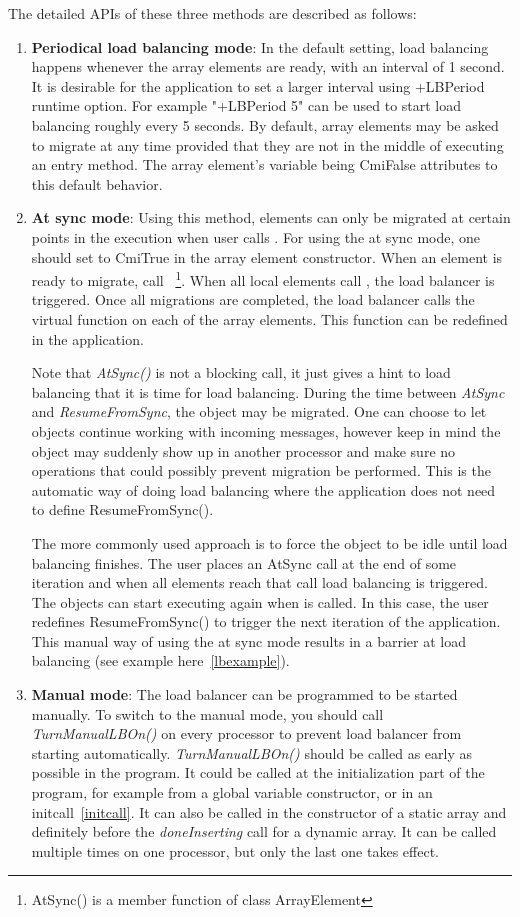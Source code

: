 The detailed APIs of these three methods are described as follows:
%
\begin{enumerate}
%
\item {\bf Periodical load balancing mode}: In the default setting, load
balancing happens whenever the array elements are ready, with an interval of 1
second. It is desirable for the application to set a larger interval using
+LBPeriod runtime option. For example "+LBPeriod 5" can be used to start load
balancing roughly every 5 seconds. By default, array elements may be asked to
migrate at any time provided that they are not in the middle of executing an
entry method. The array element's variable  being CmiFalse
attributes to this default behavior.
%
\item {\bf At sync mode}: Using this method, elements can only be migrated at
certain points in the execution when user calls . For using the at
sync mode, one should set  to CmiTrue in the array element
constructor.  When an element is ready to migrate, call
~\footnote{AtSync() is a member function of class ArrayElement}.
When all local elements call , the load balancer is triggered.  Once
all migrations are completed, the load balancer calls the virtual function
 on each of the array elements. This
function can be redefined in the application.

Note that {\em AtSync()} is not a blocking call, it just gives a hint to load
balancing that it is time for load balancing. During the time between {\em
AtSync} and {\em ResumeFromSync}, the object may be migrated. One can choose
to let objects continue working with incoming messages, however keep in mind
the object may suddenly show up in another processor and make sure no
operations that could possibly prevent migration be performed. This is the automatic way of doing load balancing where the application does not need to define ResumeFromSync().

The more commonly used approach is to force the object to be idle until load
balancing finishes. The user places an AtSync call at the end of some iteration
and when all elements reach that call load balancing is triggered. The objects
can start executing again when  is called. In this case,
the user redefines ResumeFromSync() to trigger the next iteration of the
application. This manual way of using the at sync mode results in a barrier at
load balancing (see example here~\ref{lbexample}).
%
\item {\bf Manual mode}: The load balancer can be programmed to be started
manually. To switch to the manual mode, you should call {\em TurnManualLBOn()}
on every processor to prevent load balancer from starting automatically. {\em
TurnManualLBOn()} should be called as early as possible in the program. It
could be called at the initialization part of the program, for example from a
global variable constructor, or in an initcall~\ref{initcall}.  It can also be
called in the constructor of a static array and definitely before the {\em
doneInserting} call for a dynamic array.  It can be called multiple times on
one processor, but only the last one takes effect.


\end{enumerate}

